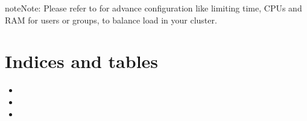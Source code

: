 \documentclass[letterpaper,10pt,english]{sphinxmanual}
\begin{document}
\begin{sphinxadmonition}{note}{Note:}
Please refer to  for advance configuration like limiting time, CPUs
and RAM for users or groups, to balance load in your cluster.
\end{sphinxadmonition}


\chapter{Indices and tables}
\label{\detokenize{index:indices-and-tables}}\begin{itemize}
\item {} 

\item {} 

\item {} 

\end{itemize}



\renewcommand{\indexname}{Index}
\printindex
\end{document}
